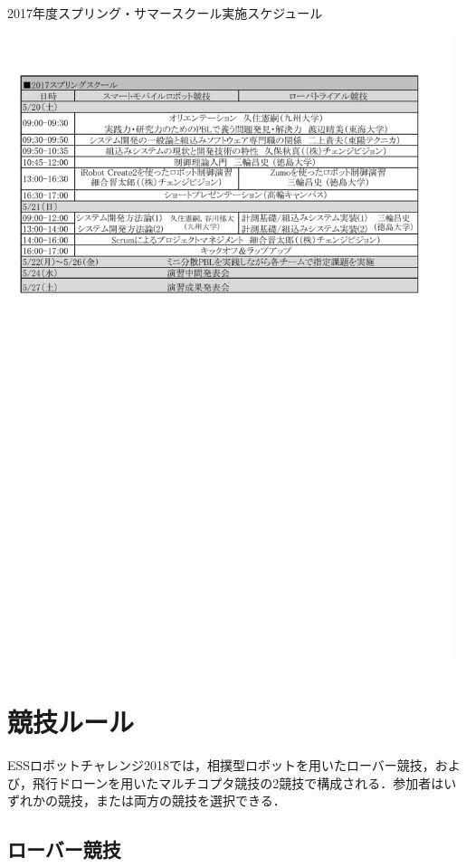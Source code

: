 \documentclass[submit]{ipsj}
\begin{document}
\begin{table}[t]
\caption{2017年度スプリング・サマースクール実施スケジュール}
\label{table:schedule}
\centering
\includegraphics[width=13cm]{images/schedule.pdf}
\end{table}

\section{競技ルール}

ESSロボットチャレンジ2018では，相撲型ロボットを用いたローバー競技，および，飛行ドローンを用いたマルチコプタ競技の2競技で構成される．参加者はいずれかの競技，または両方の競技を選択できる．

\subsection{ローバー競技}
\end{document}
